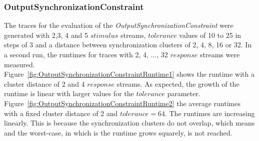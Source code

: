 \subsubsection{OutputSynchronizationConstraint}
The traces for the evaluation of the \textit{OutputSynchronizationConstraint} were generated with 2,3, 4 and 5 $stimulus$ streams, $tolerance$ values of 10 to 25 in steps of 3 and a distance between synchronization clusters of 2, 4, 8, 16 or 32. In a second run, the runtimes for traces with 2, 4, $\dots$, 32 $response$ streams were measured.\\
Figure~\ref{fig:OutputSynchronizationConstraintRuntime1} shows the runtime with a cluster distance of 2 and 4 $response$ streams. As expected, the growth of the runtime is linear with larger values for the $tolerance$ parameter. Figure~\ref{fig:OutputSynchronizationConstraintRuntime2}  the average runtimes with a fixed cluster distance of 2 and $tolerance=64$. The runtimes are increasing linearly. This is because the synchronization clusters do not overlap, which means and the worst-case, in which is the runtime grows squarely, is not reached.

